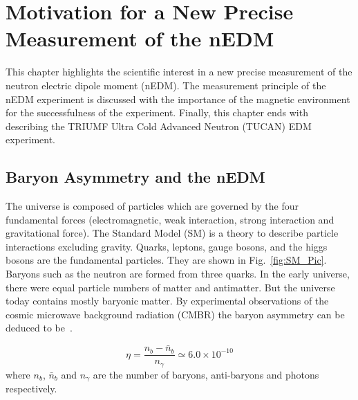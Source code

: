 \chapter{Motivation for a New Precise Measurement of the nEDM}
\label{ch:motivation} 
This chapter highlights the scientific interest in a new precise measurement of the neutron electric dipole moment (nEDM). The measurement principle of the nEDM experiment is discussed with the importance of the magnetic environment for the successfulness of the experiment. Finally, this chapter ends with describing the TRIUMF Ultra Cold Advanced Neutron (TUCAN) EDM experiment.

\section{Baryon Asymmetry and the nEDM}


The universe is composed of particles which are governed by the four fundamental forces (electromagnetic, weak interaction, strong interaction and gravitational force). The Standard Model (SM) is a theory to describe particle interactions excluding gravity. Quarks, leptons, gauge bosons, and the higgs bosons are the fundamental particles. They are shown in Fig.~\ref{fig:SM_Pic}. Baryons such as the neutron are formed from three quarks. In the early universe, there were equal particle numbers of matter and antimatter. But the universe today contains mostly baryonic matter. By experimental observations of the cosmic microwave background radiation (CMBR) the baryon asymmetry can be deduced to be~\cite{expBar}.


\begin{equation}\label{eq:baryons}
    \eta =\frac{n_b-\bar{n}_b}{n_\gamma}\simeq 6.0 \times 10^{-10}
\end{equation}
where $n_b$, $\bar{n}_b$ and ${n_\gamma}$ are the number of baryons, anti-baryons and photons respectively. 


